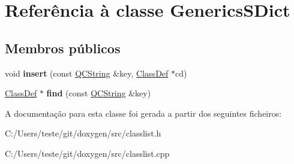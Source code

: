 \hypertarget{class_generics_s_dict}{\section{Referência à classe Generics\-S\-Dict}
\label{class_generics_s_dict}
}
\subsection*{Membros públicos}
\begin{DoxyCompactItemize}
\item 
\hypertarget{class_generics_s_dict_a4f65792066978462eb2de1e6c6e835c4}{void {\bfseries insert} (const \hyperlink{class_q_c_string}{Q\-C\-String} \&key, \hyperlink{class_class_def}{Class\-Def} $\ast$cd)}\label{class_generics_s_dict_a4f65792066978462eb2de1e6c6e835c4}

\item 
\hypertarget{class_generics_s_dict_a63e89df556bc1bbbded2b204d0b0c0db}{\hyperlink{class_class_def}{Class\-Def} $\ast$ {\bfseries find} (const \hyperlink{class_q_c_string}{Q\-C\-String} \&key)}\label{class_generics_s_dict_a63e89df556bc1bbbded2b204d0b0c0db}

\end{DoxyCompactItemize}


A documentação para esta classe foi gerada a partir dos seguintes ficheiros\-:\begin{DoxyCompactItemize}
\item 
C\-:/\-Users/teste/git/doxygen/src/classlist.\-h\item 
C\-:/\-Users/teste/git/doxygen/src/classlist.\-cpp\end{DoxyCompactItemize}
